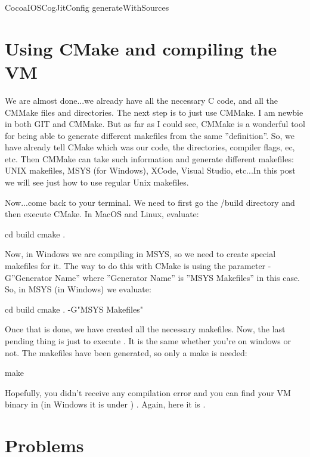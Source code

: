 \documentclass[a4paper,10pt,twoside]{book}
\begin{document}
\begin{code}{}
CocoaIOSCogJitConfig generateWithSources
\end{code}

\section{Using CMake and compiling the VM}


We are almost done...we already have all the necessary C code, and all the CMMake files and directories. The next step is to just use CMMake. I am newbie in both GIT and CMMake. But as far as I could see, CMMake is a wonderful tool for being able to generate different makefiles from the same ''definition''. So, we have already tell CMake which was our code, the directories, compiler flags, ec, etc. Then CMMake can take such information and generate different makefiles: UNIX makefiles, MSYS (for Windows), XCode, Visual Studio, etc...In this post we will see just how to use regular Unix makefiles.

Now...come back to your terminal. We need to first go the /build directory and then execute CMake. In MacOS and Linux, evaluate:

\begin{code}{}
cd build
cmake .
\end{code}


Now, in Windows we are compiling in MSYS, so we need to create special makefiles for it. The way to do this with CMake is using the parameter -G''Generator Name'' where ''Generator Name'' is ''MSYS Makefiles'' in this case. So, in MSYS (in Windows) we evaluate:

\begin{code}{}
cd build
cmake . -G"MSYS Makefiles"
\end{code}
 
Once that is done, we have created all the necessary makefiles. Now, the last pending thing is just to execute . It is the same whether you're on windows or not. The makefiles have been generated, so only a make is needed:

\begin{code}{}
make
\end{code}

Hopefully, you didn't receive any compilation error and you can find your VM binary in  (in Windows it is under ) . Again, here it is .

\section{Problems}
\end{document}
